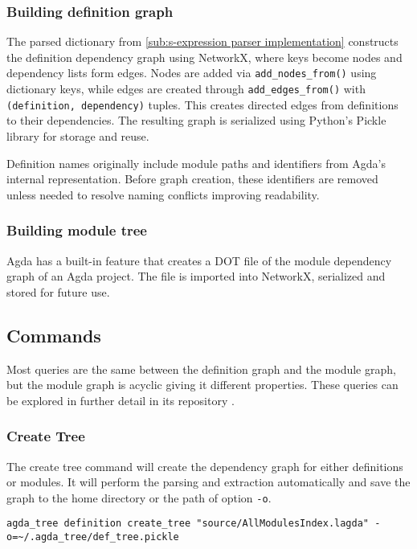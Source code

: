 \subsubsection{Building definition graph}

The parsed dictionary from \cref{sub:s-expression parser implementation}
constructs the definition dependency graph using NetworkX, where keys become
nodes and dependency lists form edges. Nodes are added via
\texttt{add\_nodes\_from()} using dictionary keys, while edges are created
through \texttt{add\_edges\_from()} with \texttt{(definition, dependency)}
tuples. This creates directed edges from definitions to their dependencies. The
resulting graph is serialized using Python's Pickle library for storage and
reuse.

Definition names originally include module paths and identifiers from Agda's
internal representation. Before graph creation, these identifiers are removed
unless needed to resolve naming conflicts improving readability.

\subsubsection{Building module tree} \label{sub: Building Module Tree}

Agda has a built-in feature that creates a DOT file of the module dependency
graph of an Agda project. The file is imported into NetworkX, serialized and
stored for future use.

\subsection{Commands}

Most queries are the same between the definition graph and the module graph,
but the module graph is acyclic giving it different properties. These queries
can be explored in further detail in its repository \cite{agda_html}.


\subsubsection{Create Tree}

The create tree command will create the dependency graph for either definitions
or modules. It will perform the parsing and extraction automatically and save
the graph to the home directory or the path of option \texttt{-o}.

\noindent
\begin{minipage}{\textwidth}
\begin{lstlisting}
agda_tree definition create_tree "source/AllModulesIndex.lagda" -o=~/.agda_tree/def_tree.pickle
\end{lstlisting}
\end{minipage}

